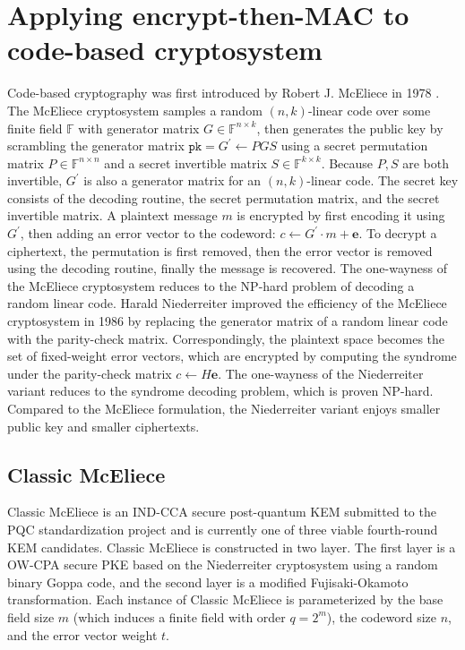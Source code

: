 \documentclass[runningheads]{llncs}
\newcommand{\pk}{\texttt{pk}}
\begin{document}
\section{Applying encrypt-then-MAC to code-based cryptosystem}\label{sec:application-to-mceliece}
Code-based cryptography was first introduced by Robert J. McEliece in 1978 \cite{McEliece1978}. The McEliece cryptosystem samples a random $(n, k)$-linear code over some finite field $\mathbb{F}$ with generator matrix $G \in \mathbb{F}^{n \times k}$, then generates the public key by scrambling the generator matrix $\pk = G^\prime \leftarrow PGS$ using a secret permutation matrix $P \in \mathbb{F}^{n \times n}$ and a secret invertible matrix $S\in\mathbb{F}^{k \times k}$. Because $P, S$ are both invertible, $G^\prime$ is also a generator matrix for an $(n, k)$-linear code. The secret key consists of the decoding routine, the secret permutation matrix, and the secret invertible matrix. A plaintext message $m$ is encrypted by first encoding it using $G^\prime$, then adding an error vector to the codeword: $c \leftarrow G^\prime\cdot m + \mathbf{e}$. To decrypt a ciphertext, the permutation is first removed, then the error vector is removed using the decoding routine, finally the message is recovered. The one-wayness of the McEliece cryptosystem reduces to the NP-hard problem of decoding a random linear code. Harald Niederreiter improved the efficiency of the McEliece cryptosystem in 1986 \cite{niederreiter1986knapsack} by replacing the generator matrix of a random linear code with the parity-check matrix. Correspondingly, the plaintext space becomes the set of fixed-weight error vectors, which are encrypted by computing the syndrome under the parity-check matrix $c \leftarrow H\mathbf{e}$. The one-wayness of the Niederreiter variant reduces to the syndrome decoding problem, which is proven NP-hard. Compared to the McEliece formulation, the Niederreiter variant enjoys smaller public key and smaller ciphertexts.

\subsection{Classic McEliece}\label{sec:classic-mceliece}
Classic McEliece \cite{ClassicMcEliece2022} is an IND-CCA secure post-quantum KEM submitted to the PQC standardization project and is currently one of three viable fourth-round KEM candidates. Classic McEliece is constructed in two layer. The first layer is a OW-CPA secure PKE based on the Niederreiter cryptosystem using a random binary Goppa code, and the second layer is a modified Fujisaki-Okamoto transformation. Each instance of Classic McEliece is parameterized by the base field size $m$ (which induces a finite field with order $q = 2^m$), the codeword size $n$, and the error vector weight $t$.
\end{document}
